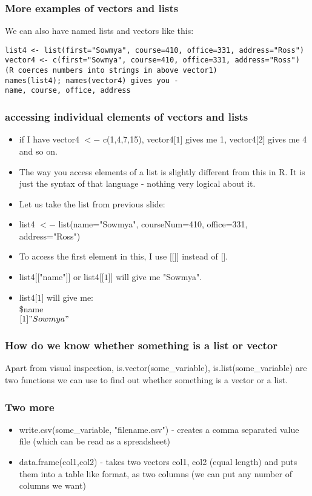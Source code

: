 \documentclass{beamer}
\begin{document}
\begin{frame}[fragile]
\frametitle{More examples of vectors and lists}
We can also have named lists and vectors like this:
\footnotesize
\begin{verbatim}
list4 <- list(first="Sowmya", course=410, office=331, address="Ross")
vector4 <- c(first="Sowmya", course=410, office=331, address="Ross")
(R coerces numbers into strings in above vector1)
names(list4); names(vector4) gives you - 
name, course, office, address
\end{verbatim}
\end{frame}

\begin{frame}
\frametitle{accessing individual elements of vectors and lists}
\begin{itemize}
\item if I have vector4 $<-$ c(1,4,7,15), vector4$\lbrack 1 \rbrack$ gives me 1,  vector4$\lbrack 2 \rbrack$ gives me 4 and so on. \pause
\item The way you access elements of a list is slightly different from this in R. It is just the syntax of that language - nothing very logical about it.
\item Let us take the list from previous slide:
\item list4 $<-$ list(name="Sowmya", courseNum=410, office=331, address="Ross")
\item To access the first element in this, I use $\lbrack \lbrack  \rbrack \rbrack$ instead of $\lbrack \rbrack$.
\item list4$  \lbrack \lbrack$"name"$\rbrack \rbrack$ or list4$  \lbrack \lbrack 1\rbrack \rbrack$ will give me "Sowmya". \pause
\item list4$ \lbrack 1\rbrack $ will give me: \\ \$name \\
$\lbrack 1\rbrack "Sowmya"$
\end{itemize}
\end{frame}


\begin{frame}
\frametitle{How do we know whether something is a list or vector}
Apart from visual inspection, is.vector(some\_variable), is.list(some\_variable) are two functions we can use to find out whether something is a vector or a list.
\end{frame}

\begin{frame}
\frametitle{Two more}
\begin{itemize}
\item write.csv(some\_variable, "filename.csv") - creates a comma separated value file (which can be read as a spreadsheet)
\item data.frame(col1,col2) - takes two vectors col1, col2 (equal length) and puts them into a table like format, as two columns (we can put any number of columns we want)
\end{itemize}
\end{frame}
\end{document}
